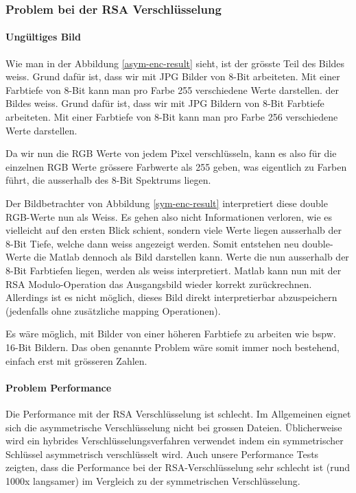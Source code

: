 \documentclass[paper=a4,fontsize=12pt]{scrartcl}
\begin{document}
\subsubsection{Problem bei der RSA Verschlüsselung} \label{problems-RSA}
\paragraph{Ungültiges Bild} \label{problem-white}
Wie man in der Abbildung \ref{asym-enc-result} sieht, ist der grösste Teil
des Bildes weiss.
Grund dafür ist, dass wir mit JPG Bilder von 8-Bit arbeiteten.
Mit einer Farbtiefe von 8-Bit kann man pro Farbe 255 verschiedene Werte darstellen.
der Bildes weiss.
Grund dafür ist, dass wir mit JPG Bildern von 8-Bit Farbtiefe arbeiteten.
Mit einer Farbtiefe von 8-Bit kann man pro Farbe 256 verschiedene Werte darstellen.

Da wir nun die RGB Werte von jedem Pixel verschlüsseln, kann es also für die einzelnen
RGB Werte grössere Farbwerte als 255 geben, was eigentlich zu Farben führt,
die ausserhalb des 8-Bit Spektrums liegen.

Der Bildbetrachter von Abbildung \ref{sym-enc-result} interpretiert diese double 
RGB-Werte nun als Weiss. 
Es gehen also nicht Informationen verloren, wie es vielleicht auf den ersten Blick schient,
sondern viele Werte liegen ausserhalb der 8-Bit Tiefe, welche dann weiss angezeigt werden.
Somit entstehen neu double-Werte die Matlab dennoch als Bild darstellen kann. Werte die nun 
ausserhalb der 8-Bit Farbtiefen liegen, werden als weiss interpretiert.
Matlab kann nun mit der RSA Modulo-Operation das Ausgangsbild wieder korrekt zurückrechnen. 
Allerdings ist es nicht möglich, dieses Bild direkt interpretierbar abzuspeichern 
(jedenfalls ohne zusätzliche mapping Operationen).

Es wäre möglich, mit Bilder von einer höheren Farbtiefe zu arbeiten wie bspw. 16-Bit Bildern.
Das oben genannte Problem wäre somit immer noch bestehend, einfach erst mit grösseren Zahlen.


\paragraph{Problem Performance} Die Performance mit der RSA Verschlüsselung ist schlecht.
Im Allgemeinen eignet sich die asymmetrische Verschlüsselung nicht bei grossen Dateien.
Üblicherweise wird ein hybrides Verschlüsselungsverfahren verwendet indem
ein symmetrischer Schlüssel asymmetrisch verschlüsselt wird.
Auch unsere Performance Tests zeigten, dass die Performance bei der RSA-Verschlüsselung
sehr schlecht ist (rund 1000x langsamer) im Vergleich zu der symmetrischen Verschlüsselung.
\end{document}
